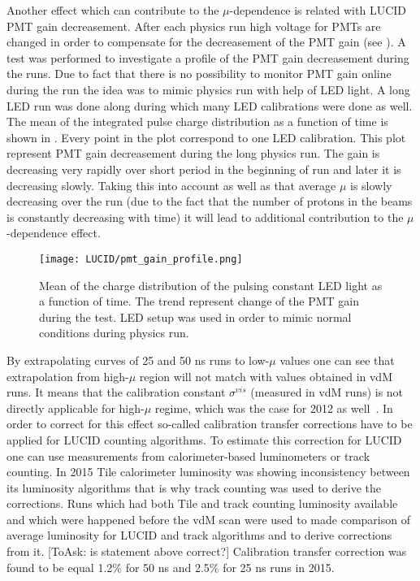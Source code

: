Another effect which can contribute to the $\mu$-dependence is related with LUCID PMT gain decreasement.
After each physics run high voltage for PMTs are changed in order to compensate for the decreasement of the PMT gain (see ).
A test was performed to investigate a profile of the PMT gain decreasement during the runs. Due to fact that there is no possibility to monitor 
PMT gain online during the run the idea was to mimic physics run with help of LED light. A long LED run was done along during which many LED calibrations were done as well.
The mean of the integrated pulse charge distribution as a function of time is shown in . Every point in the plot correspond to one LED calibration.
This plot represent PMT gain decreasement during the long physics run. The gain is decreasing very rapidly over short period in the beginning of run and later it is decreasing slowly.
Taking this into account as well as that average $\mu$ is slowly decreasing over the run (due to the fact that the number of protons in the beams is constantly decreasing with time) it will lead to additional contribution to the $\mu$-dependence effect.

\begin{figure}
\centering
\texttt{[image: LUCID/pmt\_gain\_profile.png]}
\caption{Mean of the charge distribution of the pulsing constant LED light as a function of time. The trend represent change of the PMT gain during the test.
LED setup was used in order to mimic normal conditions during physics run.}
\label{fig:pmt_gain_profile}
\end{figure}

By extrapolating curves of 25 and 50 ns runs to low-$\mu$ values one can see that extrapolation from high-$\mu$ region will not match with values obtained in vdM runs.
It means that the calibration constant $\sigma^{vis}$ (measured in vdM runs) is not directly applicable for high-$\mu$ regime, which was the case for 2012 as well~\cite{Aaboud:2016hhf}.
In order to correct for this effect so-called calibration transfer corrections have to be applied for LUCID counting algorithms.
To estimate this correction for LUCID one can use measurements from calorimeter-based luminometers or track counting.
In 2015 Tile calorimeter luminosity was showing inconsistency between its luminosity algorithms that is why track counting was used to derive the corrections.
Runs which had both Tile and track counting luminosity available and which were happened before the vdM scan were used to made comparison of average luminosity for LUCID and track algorithms
and to derive corrections from it. [ToAsk: is statement above correct?] Calibration transfer correction was found to be equal 1.2$\%$ for 50 ns and 2.5$\%$ for 25 ns runs in 2015.

